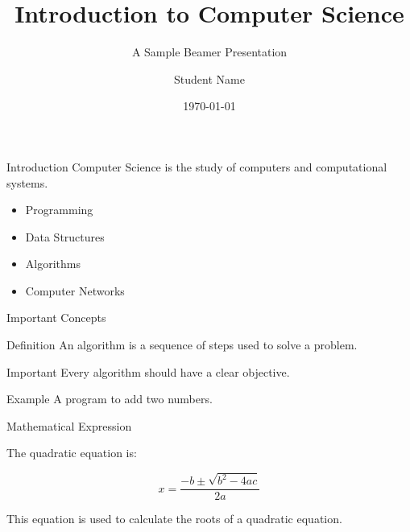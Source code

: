 \documentclass{beamer}
\title{Introduction to Computer Science}
\subtitle{A Sample Beamer Presentation}
\author{Student Name}
\institute{MNIT Jaipur}
\date{\today}
\begin{document}
\begin{frame}
\titlepage
\end{frame}

\begin{frame}{Introduction}
Computer Science is the study of computers and computational systems.

\begin{itemize}
    \item Programming
    \item Data Structures
    \item Algorithms
    \item Computer Networks
\end{itemize}
\end{frame}

\begin{frame}{Important Concepts}

\begin{block}{Definition}
An algorithm is a sequence of steps used to solve a problem.
\end{block}

\begin{alertblock}{Important}
Every algorithm should have a clear objective.
\end{alertblock}

\begin{exampleblock}{Example}
A program to add two numbers.
\end{exampleblock}

\end{frame}

\begin{frame}{Mathematical Expression}

The quadratic equation is:

\[
x = \frac{-b \pm \sqrt{b^2-4ac}}{2a}
\]

This equation is used to calculate the roots of a quadratic equation.

\end{frame}
\end{document}
